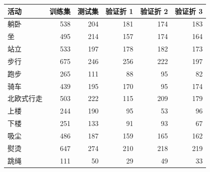 \begin{tabular}{lrrrrr}
\toprule
活动 & 训练集 & 测试集 & 验证折 1 & 验证折 2 & 验证折 3 \\
\midrule
躺卧 & 538 & 204 & 181 & 174 & 183 \\
坐 & 495 & 214 & 157 & 174 & 164 \\
站立 & 533 & 197 & 178 & 182 & 173 \\
步行 & 675 & 246 & 256 & 222 & 197 \\
跑步 & 265 & 111 & 88 & 95 & 82 \\
骑车 & 439 & 195 & 170 & 95 & 174 \\
北欧式行走 & 503 & 222 & 115 & 209 & 179 \\
上楼 & 244 & 190 & 95 & 53 & 96 \\
下楼 & 251 & 133 & 91 & 93 & 67 \\
吸尘 & 486 & 187 & 159 & 165 & 162 \\
熨烫 & 647 & 274 & 210 & 218 & 219 \\
跳绳 & 111 & 50 & 29 & 49 & 33 \\
\bottomrule
\end{tabular}
